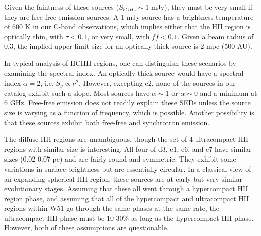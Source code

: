 Given the faintness of these sources ($S_{5 GHz} \sim 1$ mJy), they must be
very small if they are free-free emission sources.  A 1 mJy source has a
brightness temperature of 600 K in our C-band observations, which implies
either that the HII region is optically thin, with $\tau < 0.1$, or very small,
with $ff<0.1$.  Given a beam radius of 0.3\arcsec, the implied upper limit size
for an optically thick source is 2 mpc (500 AU).

In typical analysis of HCHII regions, one can distinguish these scenarios by
examining the spectral index.  An optically thick source would have a spectral
index $\alpha=2$, i.e. $S_\nu \propto \nu^2$.  However, excepting e2, none of
the sources in our catalog exhibit such a slope.  Most sources have
$\alpha\sim1$ or $\alpha\sim0$ and a minimum at 6 GHz.  Free-free emission does
not readily explain these SEDs unless the source size is varying as a function
of frequency, which is possible.  Another possibility is that these sources
exhibit both free-free and synchrotron emission.

The diffuse HII regions are unambiguous, though the set of 4 ultracompact HII
regions with similar size is interesting.  All four of d3, e1, e6, and e7 have
similar sizes (0.02-0.07 pc) and are fairly round and symmetric.  They exhibit
some variations in surface brightness but are essentially circular.  In a
classical view of an expanding spherical HII region, these sources are at early
but very similar evolutionary stages.  Assuming that these all went through a
hypercompact HII region phase, and assuming that all of the hypercompact and
ultracompact HII regions within W51 go through the same phases at the same
rate, the ultracompact HII phase must be 10-30\% as long as the hypercompact
HII phase.  However, both of these assumptions are questionable.




